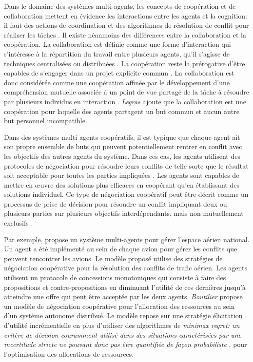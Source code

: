 		Dans le domaine des systèmes multi-agents, les concepts de coopération et de collaboration mettent en évidence les interactions entre les agents et la cognition: il faut des actions de coordination et des algorithmes de résolution de conflit pour réaliser les tâches \cite{jennings1995controlling}. Il existe néanmoins des différences entre la collaboration et la coopération.
		La collaboration est définie comme une forme d'interaction qui s'intéresse à la répartition du travail entre plusieurs agents, qu'il s'agisse de techniques centralisées ou distribuées \cite{ferber1997systemes}. La coopération reste la prérogative d'être capables de s'engager dans un projet explicite commun \cite{lucien2016multiagent}.
		La collaboration est donc considérée comme une coopération affinée par le développement d'une compréhension mutuelle associée à un point de vue partagé de la tâche à résoudre par plusieurs individus en interaction \cite{weiss1999multiagent,blanquet2007web}. \emph{Legras} \cite{legrascooperation} ajoute que la collaboration est une coopération pour laquelle des agents partagent un but commun et aucun autre but personnel incompatible. 
		
		Dans des systèmes multi agents coopératifs, il est typique que chaque agent ait son propre ensemble de buts qui peuvent potentiellement rentrer en conflit avec les objectifs des autres agents du système.
		 Dans ces cas, les agents utilisent des protocoles de négociation pour résoudre leurs conflits de telle sorte que le résultat soit acceptable pour toutes les parties impliquées \cite{wollkind2004automated}. Les agents sont capables de mettre en œuvre des solutions plus efficaces en coopérant qu'en établissant des solutions individuel. Ce type de négociation coopératif peut être décrit comme un processus de prise de décision pour résoudre un conflit impliquant deux ou plusieurs parties sur plusieurs objectifs interdépendants, mais non mutuellement exclusifs \cite{lewicki2011essentials}. 
	
		Par exemple, \cite{wollkind2004automated} propose un système multi-agents pour gérer l'espace aérien national. Un agent a été implémenté au sein de chaque avion pour gérer les conflits que peuvent rencontrer les avions. Le modèle proposé utilise des stratégies de négociation coopérative pour la résolution des conflits de trafic aérien. Les agents utilisent un protocole de concessions monotoniques \cite{zlotkin1989negotiation} qui consiste à faire des propositions et contre-propositions en diminuant l'utilité de ces dernières jusqu'à atteindre une offre qui peut être acceptée par les deux agents. 
		 \emph{Boutilier} \cite{boutilier2002cooperative} propose un modèle de négociation coopérative pour l'allocation des ressources au sein d'un système autonome distribué. Le modèle repose sur une stratégie élicitation d'utilité incrémentielle en plus d'utiliser des algorithmes de \textit{minimax regret: un critère de décision couramment utilisé dans des situations caractérisées par une incertitude stricte ne pouvant donc pas être quantifiée de façon probabiliste} \cite{borodin2005online}, pour l'optimisation des allocations de ressources.   
	
